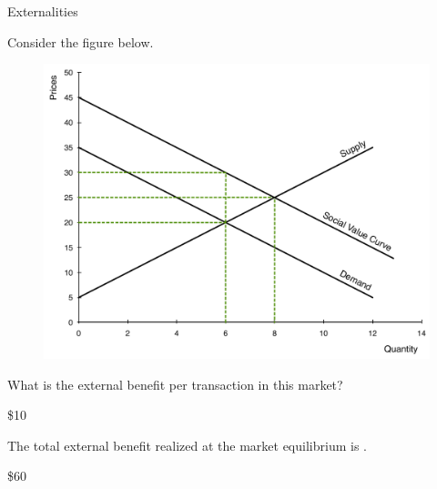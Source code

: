 \documentclass[pdf, handout]{beamer}
\begin{document}
\begin{frame}{Externalities}
	
	Consider the figure below.
	
		\begin{figure}[H]
			\centering
			\includegraphics[scale=.20]{Exam_Review5.pdf}
		\end{figure}
		
	What is the external benefit per transaction in this market?
	
	\pause
	\begin{flushright}
		
		\color{red} \$10
		
	\end{flushright}
	
	\pause
	The total external benefit realized at the market equilibrium is \underline{\hspace{2cm}}.
	
	\pause
	\begin{flushright}
		
		\color{red} \$60
		
	\end{flushright}
	

\end{frame}
\end{document}
